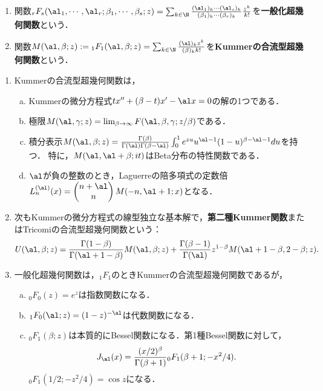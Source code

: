 \documentclass[uplatex,dvipdfmx]{jsreport}
\begin{document}
\begin{definition}\mbox{}
    \begin{enumerate}
        \item 関数${}_rF_s(\al_1,\cdots,\al_r;\beta_1,\cdots,\beta_s;z)=\sum_{k\in\N}\frac{(\al_1)_k\cdots(\al_s)_k}{(\beta_1)_k\cdots(\beta_r)_k}\frac{z^k}{k!}$を\textbf{一般化超幾何関数}という．
        \item 関数$M(\al,\beta;z):={}_1F_1(\al,\beta;z)=\sum_{k\in\N}\frac{(\al)_kz^k}{(\beta)_kk!}$を\textbf{Kummerの合流型超幾何関数}という．
    \end{enumerate}
\end{definition}

\begin{proposition}\mbox{}
    \begin{enumerate}
        \item Kummerの合流型超幾何関数は，
        \begin{enumerate}[(a)]
            \item Kummerの微分方程式$tx''+(\beta-t)x'-\al x=0$の解の1つである．
            \item 極限$M(\al,\gamma;z)=\lim_{\beta\to\infty}F(\al,\beta,\gamma;z/\beta)$である．
            \item 積分表示$M(\al,\beta;z)=\frac{\Gamma(\beta)}{\Gamma(\al)\Gamma(\beta-\al)}\int^1_0e^{zu}u^{\al-1}(1-u)^{\beta-\al-1}du$を持つ．
            特に，$M(\al,\al+\beta;it)$はBeta分布の特性関数である．
            \item $\al$が負の整数のとき，Laguerreの陪多項式の定数倍$L^{(\al)}_n(x)=\begin{pmatrix}n+\al\\n\end{pmatrix}M(-n,\al+1;x)$となる．
        \end{enumerate}
        \item 次もKummerの微分方程式の線型独立な基本解で，\textbf{第二種Kummer関数}またはTricomiの合流型超幾何関数という：
        \[U(\al,\beta;z)=\frac{\Gamma(1-\beta)}{\Gamma(\al+1-\beta)}M(\al,\beta;z)+\frac{\Gamma(\beta-1)}{\Gamma(\al)}z^{1-\beta}M(\al+1-\beta,2-\beta;z).\]
        \item 一般化超幾何関数は，${}_1F_1$のときKummerの合流型超幾何関数であるが，
        \begin{enumerate}[(a)]
            \item ${}_0F_0(z)=e^z$は指数関数になる．
            \item ${}_1F_0(\al;z)=(1-z)^{-\al}$は代数関数になる．
            \item ${}_0F_1(\beta;z)$は本質的にBessel関数になる．第1種Bessel関数に対して，
            \[J_\al(x)=\frac{(x/2)^\beta}{\Gamma(\beta+1)}{}_0F_1(\beta+1;-x^2/4).\]
            ${}_0F_1(1/2;-z^2/4)=\cos z$になる．
        \end{enumerate}
    \end{enumerate}
\end{proposition}
\end{document}
